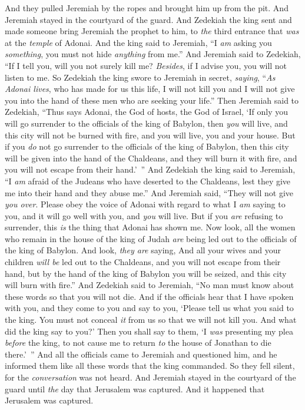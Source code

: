 \begin{biblechapter}
\verse And they pulled Jeremiah by the ropes and brought him up from the pit. And Jeremiah stayed in the courtyard of the guard.
\verse And Zedekiah the king sent and made someone bring Jeremiah the prophet to him, to \textit{the} third entrance that \textit{was} at the \textit{temple} of Adonai. And the king said to Jeremiah, “I \textit{am} asking you \textit{something}, you must not hide \textit{anything} from me.”
\verse And Jeremiah said to Zedekiah, “If I tell you, will you not surely kill me? \textit{Besides}, if I advise you, you will not listen to me.
\verse So Zedekiah the king swore to Jeremiah in secret, \textit{saying}, “\textit{As Adonai lives}, who has made for us this life, I will not kill you and I will not give you into the hand of these men who are seeking your life.”
\verse Then Jeremiah said to Zedekiah, “Thus says Adonai, the God of hosts, the God of Israel, ‘If only you will go surrender to the officials of the king of Babylon, then \textit{you} will live, and this city will not be burned with fire, and you will live, you and your house.
\verse But if you \textit{do} not go surrender to the officials of the king of Babylon, then this city will be given into the hand of the Chaldeans, and they will burn it with fire, and you will not escape from their hand.’ ”
\verse And Zedekiah the king said to Jeremiah, “I \textit{am} afraid of the Judeans who have deserted to the Chaldeans, lest they give me into their hand and they abuse me.”
\verse And Jeremiah said, “They will not give \textit{you over}. Please obey the voice of Adonai with regard to what I \textit{am} saying to you, and it will go well with you, and \textit{you} will live.
\verse But if you \textit{are} refusing to surrender, this \textit{is} the thing that Adonai has shown me.
\verse Now look, all the women who remain in the house of the king of Judah \textit{are} being led out to the officials of the king of Babylon. And look, \textit{they are} saying,
\verse And all your wives and your children \textit{will be} led out to the Chaldeans, and you will not escape from their hand, but by the hand of the king of Babylon you will be seized, and this city will burn with fire.”
\verse And Zedekiah said to Jeremiah, “No man must know about these words so that you will not die.
\verse And if the officials hear that I have spoken with you, and they come to you and say to you, ‘Please tell us what you said to the king. You must not conceal \textit{it} from us so that we will not kill you. And what did the king say to you?’
\verse Then you shall say to them, ‘I \textit{was} presenting my plea \textit{before} the king, to not cause me to return \textit{to} the house of Jonathan to die there.’ ”
\verse And all the officials came to Jeremiah and questioned him, and he informed them like all these words that the king commanded. So they fell silent, for the \textit{conversation} was not heard.
\verse And Jeremiah stayed in the courtyard of the guard until \textit{the} day that Jerusalem was captured. And it happened that Jerusalem was captured.
\end{biblechapter}

